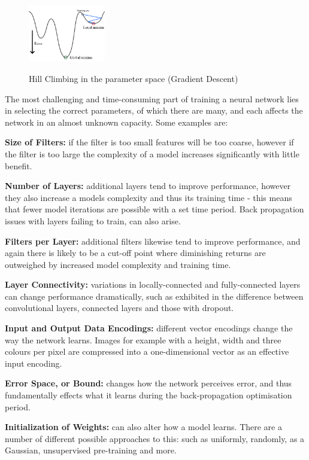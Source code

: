 \documentclass[a4paper,11pt,titlepage]{article}
\begin{document}
		\begin{figure}[H]
    			\centering	
			{{\includegraphics[width=0.3\textwidth]
    				{img/gradient_descent.png} 
    			}}%
    			\caption{Hill Climbing in the parameter space (Gradient Descent)}%
    			\label{fig:GradDesc}
		\end{figure}	
		
		\par 
		The most challenging and time-consuming part of training a neural network lies in selecting the correct parameters, of which there are many, and each affects the network in an almost unknown capacity. Some examples are:
		\par
		\textbf{Size of Filters:} if the filter is too small features will be too coarse, however if the filter is too large the complexity of a model increases significantly with little benefit.
		\par
		\textbf{Number of Layers:} additional layers tend to improve performance, however they also increase a models complexity and thus its training time - this means that fewer model iterations are possible with a set time period. Back propagation issues with layers failing to train, can also arise.
		\par 
		\textbf{Filters per Layer:} additional filters likewise tend to improve performance, and again there is likely to be a cut-off point where diminishing returns are outweighed by increased model complexity and training time.
		\par  
		\textbf{Layer Connectivity:} variations in locally-connected and fully-connected layers can change performance dramatically, such as exhibited in the difference between convolutional layers, connected layers and those with dropout.
		\par 
		\textbf{Input and Output Data Encodings:} different vector encodings change the way the network learns. Images for example with a height, width and three colours per pixel are compressed into a one-dimensional vector as an effective input encoding.
		\par  		
		\textbf{Error Space, or Bound:} changes how the network perceives error, and thus fundamentally effects what it learns during the back-propagation optimisation period.
		\par		 		
		\textbf{Initialization of Weights:} can also alter how a model learns. There are a number of different possible approaches to this: such as uniformly, randomly, as a Gaussian, unsupervised pre-training and more.
		
\end{document}
